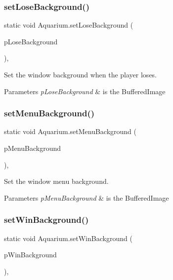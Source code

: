 \subsubsection{\texorpdfstring{set\+Lose\+Background()}{setLoseBackground()}}
{\footnotesize\ttfamily static void Aquarium.\+set\+Lose\+Background (\begin{DoxyParamCaption}\item[{final Buffered\+Image}]{p\+Lose\+Background }\end{DoxyParamCaption})\hspace{0.3cm}{\ttfamily [inline]}, {\ttfamily [static]}}

Set the window background when the player loses.


\begin{DoxyParams}{Parameters}
{\em p\+Lose\+Background} & is the Buffered\+Image \\
\hline
\end{DoxyParams}
\mbox{\label{class_aquarium_a97fa4960f66a18b449a122ef11abcb0b}} 
\subsubsection{\texorpdfstring{set\+Menu\+Background()}{setMenuBackground()}}
{\footnotesize\ttfamily static void Aquarium.\+set\+Menu\+Background (\begin{DoxyParamCaption}\item[{final Buffered\+Image}]{p\+Menu\+Background }\end{DoxyParamCaption})\hspace{0.3cm}{\ttfamily [inline]}, {\ttfamily [static]}}

Set the window menu background.


\begin{DoxyParams}{Parameters}
{\em p\+Menu\+Background} & is the Buffered\+Image \\
\hline
\end{DoxyParams}
\mbox{\label{class_aquarium_a4133a27a6feca8d8cdffaad0ada7da0f}} 
\subsubsection{\texorpdfstring{set\+Win\+Background()}{setWinBackground()}}
{\footnotesize\ttfamily static void Aquarium.\+set\+Win\+Background (\begin{DoxyParamCaption}\item[{final Buffered\+Image}]{p\+Win\+Background }\end{DoxyParamCaption})\hspace{0.3cm}{\ttfamily [inline]}, {\ttfamily [static]}}

